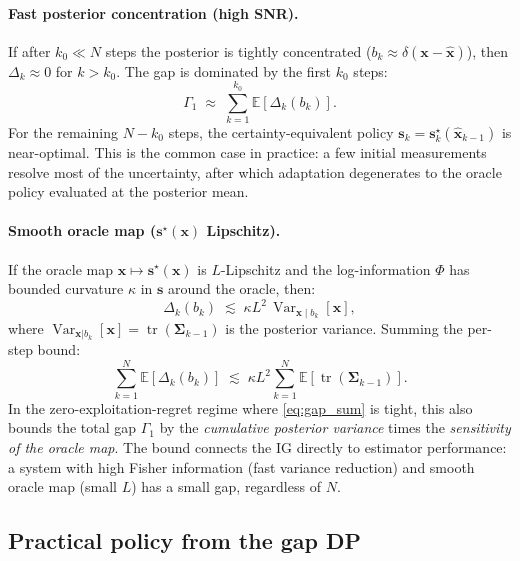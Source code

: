 \documentclass[11pt,a4paper]{article}
\newcommand{\E}{\mathbb{E}}
\newcommand{\tr}{\operatorname{tr}}
\newcommand{\Var}{\operatorname{Var}}
\begin{document}
\paragraph{Fast posterior concentration (high SNR).}
If after $k_0 \ll N$ steps the posterior is tightly concentrated ($b_k \approx \delta(\bm{x} - \hat{\bm{x}})$), then $\Delta_k \approx 0$ for $k > k_0$.  The gap is dominated by the first $k_0$ steps:
\begin{equation}
  \Gamma_1 \;\approx\; \sum_{k=1}^{k_0} \E[\Delta_k(b_k)].
\end{equation}
For the remaining $N - k_0$ steps, the certainty-equivalent policy $\bm{s}_k = \bm{s}_k^\star(\hat{\bm{x}}_{k-1})$ is near-optimal.  This is the common case in practice: a few initial measurements resolve most of the uncertainty, after which adaptation degenerates to the oracle policy evaluated at the posterior mean.

\paragraph{Smooth oracle map ($\bm{s}^\star(\bm{x})$ Lipschitz).}
If the oracle map $\bm{x} \mapsto \bm{s}^\star(\bm{x})$ is $L$-Lipschitz and the log-information $\Phi$ has bounded curvature $\kappa$ in $\bm{s}$ around the oracle, then:
\begin{equation}
  \Delta_k(b_k) \;\lesssim\; \kappa L^2 \, \Var_{\bm{x} \mid b_k}\!\left[\bm{x}\right],
  \label{eq:delta_bound}
\end{equation}
where $\Var_{\bm{x}|b_k}[\bm{x}] = \tr(\bm{\Sigma}_{k-1})$ is the posterior variance.  Summing the per-step bound:
\begin{equation}
  \sum_{k=1}^{N} \E\!\left[\Delta_k(b_k)\right] \;\lesssim\; \kappa L^2 \sum_{k=1}^{N} \E\!\left[\tr(\bm{\Sigma}_{k-1})\right].
  \label{eq:total_gap_bound}
\end{equation}
In the zero-exploitation-regret regime where \eqref{eq:gap_sum} is tight, this also bounds the total gap $\Gamma_1$ by the \emph{cumulative posterior variance} times the \emph{sensitivity of the oracle map}.  The bound connects the IG directly to estimator performance: a system with high Fisher information (fast variance reduction) and smooth oracle map (small $L$) has a small gap, regardless of $N$.

\subsection{Practical policy from the gap DP}
\end{document}
